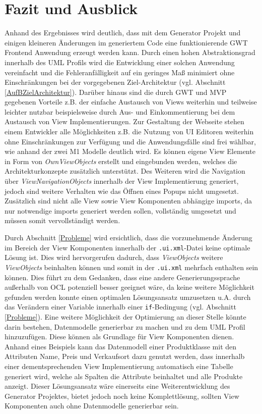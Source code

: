 \chapter{Fazit und Ausblick}
\label{FazitAusblick}
Anhand des Ergebnisses wird deutlich, dass mit dem Generator Projekt und einigen
kleineren Änderungen im generiertem Code eine funktionierende GWT Frontend
Anwendung erzeugt werden kann. Durch einen
hohen Abstraktionsgrad innerhalb des UML Profils wird die Entwicklung einer
solchen Anwendung vereinfacht und die Fehleranfälligkeit auf ein geringes Maß minimiert ohne
Einschränkungen bei der vorgegebenen Ziel-Architektur (vgl. Abschnitt
\ref{AufBZielArchitektur}).
Darüber hinaus sind die durch GWT und MVP gegebenen Vorteile z.B. der
einfache Austausch von Views weiterhin und teilweise leichter nutzbar
beispielsweise durch Aus- und Einkommentierung bei dem Austausch von View
Implementierungen.
Zur Gestaltung der Webseite stehen einem Entwickler alle Möglichkeiten z.B. die
Nutzung von UI Editoren weiterhin ohne Einschränkungen zur Verfügung und die
Anwendungsfälle sind frei wählbar, wie anhand der zwei M1 Modelle deutlich wird.
Es können eigene View Elemente in Form von \textit{OwnViewObjects} erstellt und
eingebunden werden, welches die Architekturkonzepte zusätzlich unterstützt. Des Weiteren wird die Navigation
über \textit{ViewNavigationObjects} innerhalb der View Implementierung
generiert, jedoch sind weitere Verhalten wie das Öffnen eines Popups nicht
umgesetzt. Zusätzlich sind nicht alle View sowie View Komponenten abhängige
imports, da nur notwendige imports generiert werden sollen, vollständig umgesetzt
und müssen somit vervollständigt werden.

Durch Abschnitt \ref{Probleme} wird ersichtlich, dass die
vorzunehmende Änderung im Bereich der View Komponenten innerhalb der \texttt{.ui.xml}-Datei keine optimale
Lösung ist. Dies wird hervorgerufen dadurch, dass \textit{ViewObjects} weitere
\textit{ViewObjects} beinhalten können und somit in der \texttt{.ui.xml}
mehrfach enthalten sein können. Dies führt zu dem Gedanken, dass eine andere
Generierungssprache außerhalb von OCL potenziell besser geeignet wäre, da keine
weitere Möglichkeit gefunden werden konnte einen optimalen Lösungsansatz
umzusetzen u.A. durch das Verändern einer Variable innerhalb einer
\texttt{if}-Bedingung (vgl. Abschnitt \ref{Probleme}).
Eine weitere Möglichkeit der Optimierung an dieser Stelle könnte darin bestehen,
Datenmodelle generierbar zu machen und zu dem UML Profil hinzuzufügen. Diese
können als Grundlage für View Komponenten dienen.
Anhand eines Beispiels kann das Datenmodell einer Produktklasse mit den Attributen Name,
Preis und Verkaufsort dazu genutzt werden, dass innerhalb einer
dementsprechenden View Implementierung automatisch eine Tabelle generiert wird,
welche als Spalten die Attribute beinhaltet und alle Produkte anzeigt. Dieser Lösungsansatz wäre einerseits eine
Weiterentwicklung des Generator Projektes, bietet jedoch noch keine
Komplettlösung, sollten View Komponenten auch ohne Datenmodelle
generierbar sein.

